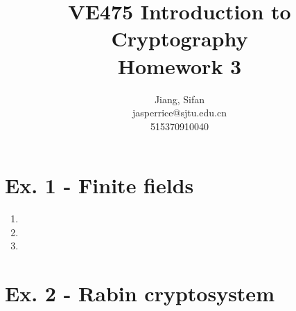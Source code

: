 \documentclass[11pt,a4paper]{article}
\title{
	VE475 Introduction to Cryptography \\
	Homework 3
}
\author{
	Jiang, Sifan\\
	jasperrice@sjtu.edu.cn\\
	515370910040
}
\begin{document}
\maketitle


\section*{Ex. 1 - Finite fields}
\begin{enumerate}
	\item 

	\item 
	
	\item 
\end{enumerate}


\section*{Ex. 2 - Rabin cryptosystem}
\end{document}
